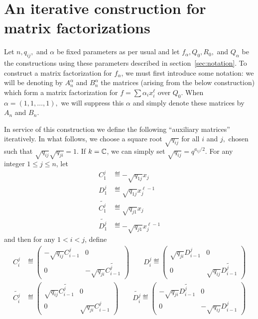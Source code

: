 \documentclass [11pt, proquest] {uwthesis}[2020/02/24]
\begin{document}
\section{An iterative construction for matrix factorizations}\label{sec:resolution-construction}
    Let $n,q_{ij},$ and $\alpha$ be fixed parameters as per usual and let $f_\alpha,Q_0, R_0,$ and $Q_\alpha$ be the constructions using these parameters described in section~\ref{sec:notation}. To construct a matrix factorization for $f_\alpha$, we must first introduce some notation: we will be denoting by 
    $A_n^\alpha$ and $B_n^\alpha$ the matrices (arising from the below construction) which form a matrix factorization for $f=\sum \alpha_ix_i^\ell$ over $Q_0$. When $\alpha=(1,1,\dots,1),$ we will suppress this $\alpha$ and simply denote these matrices by $A_n$ and $B_n$.
    
    In service of this construction we define the following ``auxiliary matrices'' iteratively. In what follows, we choose a square root $\sqrt{q_{ij}}$ for all $i$ and $j,$ chosen such that $\sqrt{q_{ij}}\sqrt{q_{ji}}=1.$ If $k=\mathbb{C}$, we can simply set $\sqrt{q_{ij}}=q^{a_{ij}/2}.$ For any integer $1\le j\le n$, let
    \begin{align*}
        C_1^j&\eqdef -\sqrt{q_{1j}}x_j\\
        D_1^j&\eqdef \sqrt{q_{1j}}x_j^{\ell -1}\\
        \widetilde{C_1^j} &\eqdef \sqrt{q_{j1}}x_j\\
        \widetilde{D_1^j}&\eqdef -\sqrt{q_{j1}}x_j^{\ell -1}
    \end{align*}
    and then for any $1< i< j$, define
    \begin{align*}
        C_i^j&\eqdef\begin{pmatrix}-\sqrt{q_{ij}}C_{i-1}^j & 0\\0 & -\sqrt{q_{ji}}\widetilde{C_{i-1}^j}\end{pmatrix}\qquad
        D_i^j\eqdef\begin{pmatrix}\sqrt{q_{ji}}D_{i-1}^j & 0\\0 & \sqrt{q_{ij}}\widetilde{D_{i-1}^j}\end{pmatrix}\\
        \widetilde{C_i^j}&\eqdef\begin{pmatrix}\sqrt{q_{ij}}\widetilde{C_{i-1}^j} & 0\\0 & \sqrt{q_{ji}}C_{i-1}^j\end{pmatrix}\qquad
        \widetilde{D_i^j}\eqdef\begin{pmatrix}-\sqrt{q_{ji}}\widetilde{D_{i-1}^j} & 0\\0 & -\sqrt{q_{ij}}D_{i-1}^j\end{pmatrix}
    \end{align*}
    
\end{document}
